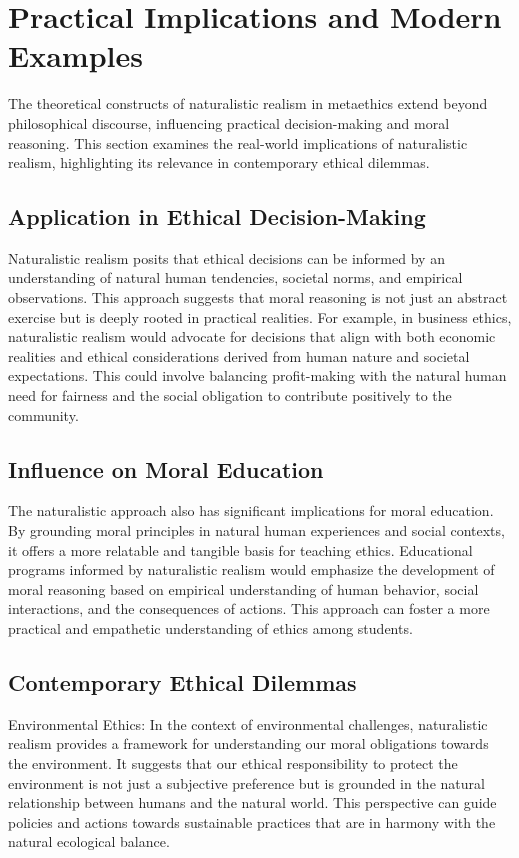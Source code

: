 \documentclass[12pt,a4paper]{article}
\begin{document}
\section{Practical Implications and Modern Examples}

The theoretical constructs of naturalistic realism in metaethics extend beyond philosophical discourse, influencing practical decision-making and moral reasoning. This section examines the real-world implications of naturalistic realism, highlighting its relevance in contemporary ethical dilemmas.

\subsection{Application in Ethical Decision-Making}
Naturalistic realism posits that ethical decisions can be informed by an understanding of natural human tendencies, societal norms, and empirical observations. This approach suggests that moral reasoning is not just an abstract exercise but is deeply rooted in practical realities. For example, in business ethics, naturalistic realism would advocate for decisions that align with both economic realities and ethical considerations derived from human nature and societal expectations. This could involve balancing profit-making with the natural human need for fairness and the social obligation to contribute positively to the community.

\subsection{Influence on Moral Education}
The naturalistic approach also has significant implications for moral education. By grounding moral principles in natural human experiences and social contexts, it offers a more relatable and tangible basis for teaching ethics. Educational programs informed by naturalistic realism would emphasize the development of moral reasoning based on empirical understanding of human behavior, social interactions, and the consequences of actions. This approach can foster a more practical and empathetic understanding of ethics among students.

\subsection{Contemporary Ethical Dilemmas}
Environmental Ethics: In the context of environmental challenges, naturalistic realism provides a framework for understanding our moral obligations towards the environment. It suggests that our ethical responsibility to protect the environment is not just a subjective preference but is grounded in the natural relationship between humans and the natural world. This perspective can guide policies and actions towards sustainable practices that are in harmony with the natural ecological balance.
\end{document}
